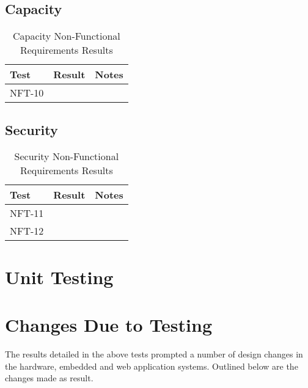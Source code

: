 \documentclass[12pt, titlepage]{article}
\begin{document}
\subsection{Capacity}

\begin{table}[H]
\centering
    \setlength{\leftmargini}{0.4cm}
    \begin{tabular}{| >{\centering\arraybackslash}m{3cm} | 
      >{\centering\arraybackslash}m{4cm} | 
      >{\centering\arraybackslash}m{6cm} |}
    \hline
    \rowcolor[gray]{0.9}
    Test & Result & Notes\\
    \hline
    NFT-10 &  & \\
    \hline
    \end{tabular}
\caption{Capacity Non-Functional Requirements Results}
\end{table}

\subsection{Security}

\begin{table}[H]
\centering
    \setlength{\leftmargini}{0.4cm}
    \begin{tabular}{| >{\centering\arraybackslash}m{3cm} | 
      >{\centering\arraybackslash}m{4cm} | 
      >{\centering\arraybackslash}m{6cm} |}
    \hline
    \rowcolor[gray]{0.9}
    Test & Result & Notes\\
    \hline
    NFT-11 &  & \\
    \hline
    NFT-12 &  & \\
    \hline
    \end{tabular}
\caption{Security Non-Functional Requirements Results}
\end{table}

\section{Unit Testing}

\section{Changes Due to Testing}
The results detailed in the above tests prompted a number of design changes in 
the hardware, embedded and web application systems. Outlined below are the 
changes made as result. 
\end{document}
